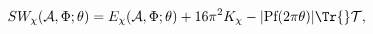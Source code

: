 \begin{equation}
 SW_\chi(\mathcal{A},\Phi;\theta)=E_\chi(\mathcal{A},\Phi;\theta)+
 16\pi^2K_\chi-|\text{Pf}(2\pi\theta)|\Tr{}\mathcal{T},
\end{equation} 
